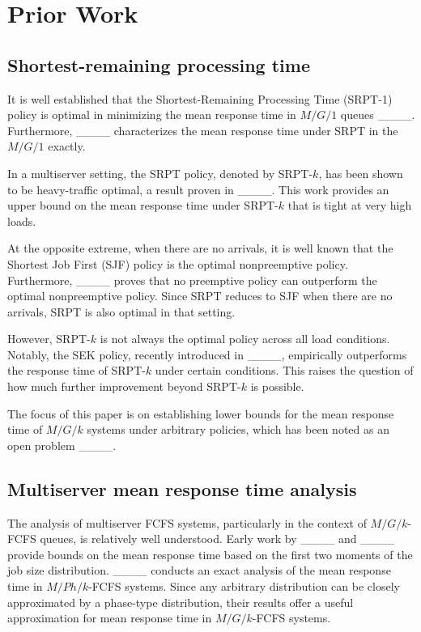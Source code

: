 \section{Prior Work}
\label{sec:prior_work}

\subsection{Shortest-remaining processing time}
It is well established that the Shortest-Remaining Processing Time (SRPT-1) policy is optimal in minimizing the mean response time in $M/G/1$ queues  ____. Furthermore, ____ characterizes the mean response time under SRPT in the $M/G/1$ exactly. 

In a multiserver setting, the SRPT policy, denoted by SRPT-$k$, has been shown to be heavy-traffic optimal, a result proven in ____. This work provides an upper bound on the mean response time under SRPT-$k$ that is tight at very high loads.

At the opposite extreme, when there are no arrivals, it is well known that the Shortest Job First (SJF) policy is the optimal nonpreemptive policy. Furthermore, ____ proves that no preemptive policy can outperform the optimal nonpreemptive policy. Since SRPT reduces to SJF when there are no arrivals, SRPT is also optimal in that setting.

However, SRPT-$k$ is not always the optimal policy across all load conditions. Notably, the SEK policy, recently introduced in ____, empirically outperforms the response time of SRPT-$k$ under certain conditions. This raises the question of how much further improvement beyond SRPT-$k$ is possible.

The focus of this paper is on establishing lower bounds for the mean response time of $M/G/k$ systems under arbitrary policies, which has been noted as an open problem ____.

\subsection{Multiserver mean response time analysis}
The analysis of multiserver FCFS systems, particularly in the context of $M/G/k$-FCFS queues, is relatively well understood. Early work by ____ and ____ provide bounds on the mean response time based on the first two moments of the job size distribution. ____ conducts an exact analysis of the mean response time in $M/Ph/k$-FCFS systems. Since any arbitrary distribution can be closely approximated by a phase-type distribution, their results offer a useful approximation for mean response time in $M/G/k$-FCFS systems. 

